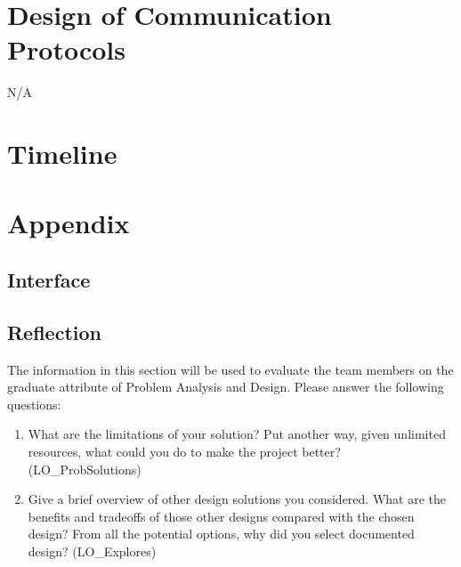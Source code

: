 \documentclass[12pt, titlepage]{article}
\begin{document}
\section{Design of Communication Protocols}
N/A

\section{Timeline}


% 

\newpage

\section{Appendix}

\subsection{Interface}


\subsection{Reflection}

The information in this section will be used to evaluate the team members on the graduate attribute
of Problem Analysis and Design. Please answer the following questions:

\begin{enumerate}
	\item What are the limitations of your solution? Put another way, given unlimited resources, what could
	      you do to make the project better? (LO\_ProbSolutions)
	\item Give a brief overview of other design solutions you considered. What are the benefits and tradeoffs
	      of those other designs compared with the chosen design? From all the potential options, why did you
	      select documented design? (LO\_Explores)
\end{enumerate}
\end{document}
